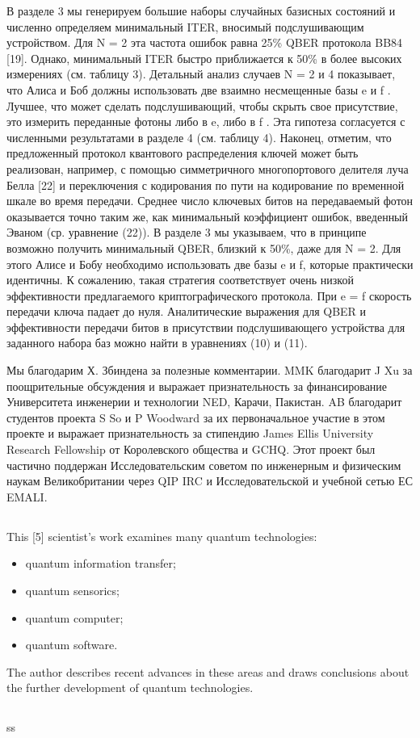 В разделе 3 мы генерируем большие наборы случайных базисных состояний и численно определяем минимальный ITER, вносимый подслушивающим устройством. Для N = 2 эта частота ошибок равна 25\% QBER протокола BB84 [19]. Однако, минимальный ITER быстро приближается к 50\% в более высоких измерениях (см. таблицу 3). Детальный анализ случаев N = 2 и 4 показывает, что Алиса и Боб должны использовать две взаимно несмещенные базы e и f . Лучшее, что может сделать подслушивающий, чтобы скрыть свое присутствие, это измерить переданные фотоны либо в e, либо в f . Эта гипотеза согласуется с численными результатами в разделе 4 (см. таблицу 4). Наконец, отметим, что предложенный протокол квантового распределения ключей может быть реализован, например, с помощью симметричного многопортового делителя луча Белла [22] и переключения с кодирования по пути на кодирование по временной шкале во время передачи. Среднее число ключевых битов на передаваемый фотон оказывается точно таким же, как минимальный коэффициент ошибок, введенный Эваном (ср. уравнение (22)).
В разделе 3 мы указываем, что в принципе возможно получить минимальный QBER, близкий к 50\%, даже для N = 2. Для этого Алисе и Бобу необходимо использовать две базы e и f, которые практически идентичны. К сожалению, такая стратегия соответствует очень низкой эффективности предлагаемого криптографического протокола. При e = f скорость передачи ключа падает до нуля. Аналитические выражения для QBER и эффективности передачи битов в присутствии подслушивающего устройства для заданного набора баз можно найти в уравнениях (10) и (11).

Мы благодарим Х. Збиндена за полезные комментарии. MMK благодарит J Xu за поощрительные обсуждения и выражает признательность за финансирование Университета инженерии и технологии NED, Карачи, Пакистан. AB благодарит студентов проекта S So и P Woodward за их первоначальное участие в этом проекте и выражает признательность за стипендию James Ellis University Research Fellowship от Королевского общества и GCHQ. Этот проект был частично поддержан Исследовательским советом по инженерным и физическим наукам Великобритании через QIP IRC и Исследовательской и учебной сетью ЕС EMALI.
\subsection{\review}
This [5] scientist's work examines many quantum technologies:
\begin{itemize}
	\item quantum information transfer;
	\item quantum sensorics;
	\item quantum computer;
	\item quantum software.
\end{itemize}
The author describes recent advances in these areas and draws conclusions about the further development of quantum technologies.


\subsection{\dic}
ss